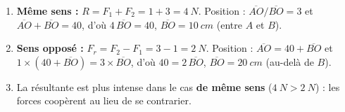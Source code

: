 \documentclass[11pt,a4paper]{article}
\begin{document}
\begin{corrige}
\begin{enumerate}[label=\alph*)]
  \item \textbf{Même sens :} $R=F_1+F_2=1+3=\qty{4}{N}$. Position : $\overline{AO}/\overline{BO}=3$ et
        $\overline{AO}+\overline{BO}=40$, d'où $4\,\overline{BO}=40$, $\overline{BO}=\qty{10}{cm}$
        (entre $A$ et $B$).
  \item \textbf{Sens opposé :} $F_r=F_2-F_1=3-1=\qty{2}{N}$. Position : $\overline{AO}=40+\overline{BO}$
        et $1\times(40+\overline{BO})=3\times\overline{BO}$, d'où $40=2\,\overline{BO}$,
        $\overline{BO}=\qty{20}{cm}$ (au-delà de $B$).
  \item La résultante est plus intense dans le cas \textbf{de même sens} ($\qty{4}{N}>\qty{2}{N}$) :
        les forces coopèrent au lieu de se contrarier.
\end{enumerate}
\end{corrige}
\end{document}
